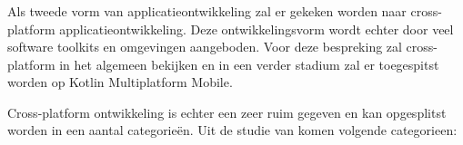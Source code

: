 
\subsubsection{}
\label{sec:SVZcrossplatform}
Als tweede vorm van applicatieontwikkeling zal er gekeken worden naar cross-platform applicatieontwikkeling. Deze ontwikkelingsvorm wordt echter door veel software toolkits en omgevingen aangeboden. Voor deze bespreking zal cross-platform in het algemeen bekijken en in een verder stadium zal er toegespitst worden op Kotlin Multiplatform Mobile.

Cross-platform ontwikkeling is echter een zeer ruim gegeven en kan opgesplitst worden in een aantal categorieën. Uit de studie van \textcite{Xanthopoulos2013} komen volgende categorieen:
